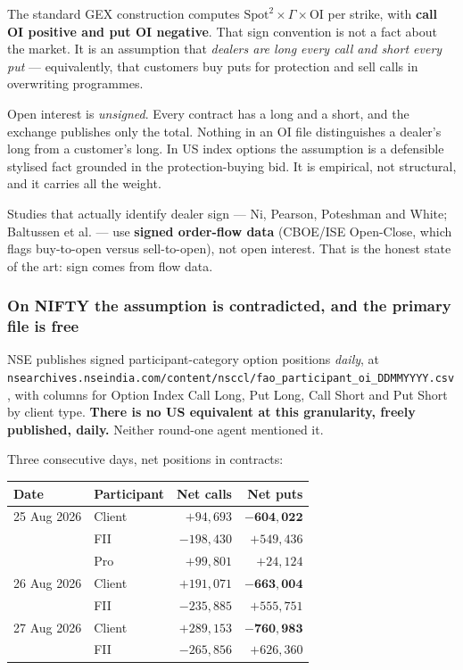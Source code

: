 \documentclass[11pt,a4paper]{article}
\begin{document}
The standard GEX construction computes $\text{Spot}^2 \times \Gamma \times
\text{OI}$ per strike, with \textbf{call OI positive and put OI negative}. That
sign convention is not a fact about the market. It is an assumption that
\emph{dealers are long every call and short every put} --- equivalently, that
customers buy puts for protection and sell calls in overwriting programmes.

Open interest is \emph{unsigned}. Every contract has a long and a short, and the
exchange publishes only the total. Nothing in an OI file distinguishes a dealer's
long from a customer's long. In US index options the assumption is a defensible
stylised fact grounded in the protection-buying bid. It is empirical, not
structural, and it carries all the weight.

Studies that actually identify dealer sign --- Ni, Pearson, Poteshman and White;
Baltussen et al. --- use \textbf{signed order-flow data} (CBOE/ISE Open-Close,
which flags buy-to-open versus sell-to-open), not open interest. That is the
honest state of the art: sign comes from flow data.

\subsubsection{On NIFTY the assumption is contradicted, and the primary file is free}

NSE publishes signed participant-category option positions \emph{daily}, at
\texttt{nsearchives.nseindia.com/content/nsccl/fao\_participant\_oi\_DDMMYYYY.csv},
with columns for Option Index Call Long, Put Long, Call Short and Put Short by
client type. \textbf{There is no US equivalent at this granularity, freely
published, daily.} Neither round-one agent mentioned it.

Three consecutive days, net positions in contracts:

\begin{center}
\begin{tabular}{@{}llrr@{}}
\toprule
Date & Participant & Net calls & Net puts \\
\midrule
25 Aug 2026 & Client & $+94{,}693$  & $\mathbf{-604{,}022}$ \\
            & FII    & $-198{,}430$ & $+549{,}436$ \\
            & Pro    & $+99{,}801$  & $+24{,}124$ \\
26 Aug 2026 & Client & $+191{,}071$ & $\mathbf{-663{,}004}$ \\
            & FII    & $-235{,}885$ & $+555{,}751$ \\
27 Aug 2026 & Client & $+289{,}153$ & $\mathbf{-760{,}983}$ \\
            & FII    & $-265{,}856$ & $+626{,}360$ \\
\bottomrule
\end{tabular}
\end{center}
\end{document}

